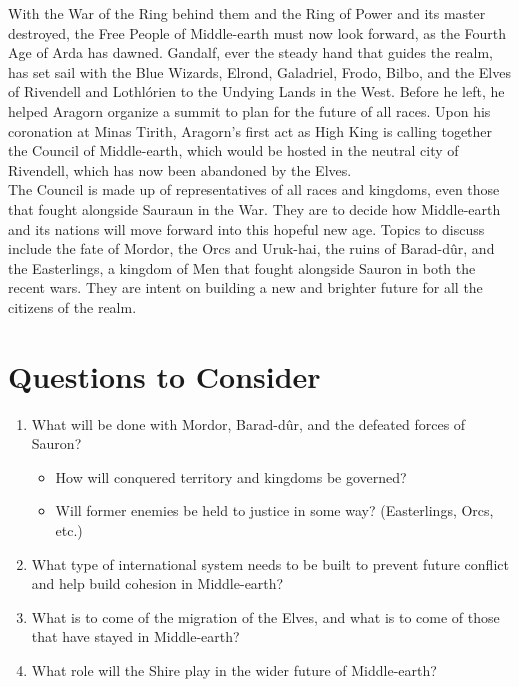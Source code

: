 \documentclass[10pt, letterpaper]{article}
\begin{document}
\noindent With the War of the Ring behind them and the Ring of Power and its master destroyed, the Free People of Middle-earth must now look forward, as the Fourth Age of Arda has dawned. Gandalf, ever the steady hand that guides the realm, has set sail with the Blue Wizards, Elrond, Galadriel, Frodo, Bilbo, and the Elves of Rivendell and Lothlórien to the Undying Lands in the West. Before he left, he helped Aragorn organize a summit to plan for the future of all races. Upon his coronation at Minas Tirith, Aragorn’s first act as High King is calling together the Council of Middle-earth, which would be hosted in the neutral city of Rivendell, which has now been abandoned by the Elves. \\

\noindent The Council is made up of representatives of all races and kingdoms, even those that fought alongside Sauraun in the War. They are to decide how Middle-earth and its nations will move forward into this hopeful new age. Topics to discuss include the fate of Mordor, the Orcs and Uruk-hai, the ruins of Barad-dûr, and the Easterlings, a kingdom of Men that fought alongside Sauron in both the recent wars. They are intent on building a new and brighter future for all the citizens of the realm. \\

\newpage

\section{Questions to Consider}
\begin{enumerate}
    \item {What will be done with Mordor, Barad-dûr, and the defeated forces of Sauron?}
    \begin{itemize}
        \item {How will conquered territory and kingdoms be governed?}
        \item {Will former enemies be held to justice in some way? (Easterlings, Orcs, etc.)}
    \end{itemize}
    \item{What type of international system needs to be built to prevent future conflict and help build cohesion in Middle-earth?}
    \item{What is to come of the migration of the Elves, and what is to come of those that have stayed in Middle-earth?}
    \item{What role will the Shire play in the wider future of Middle-earth?}
\end{enumerate}
\end{document}
